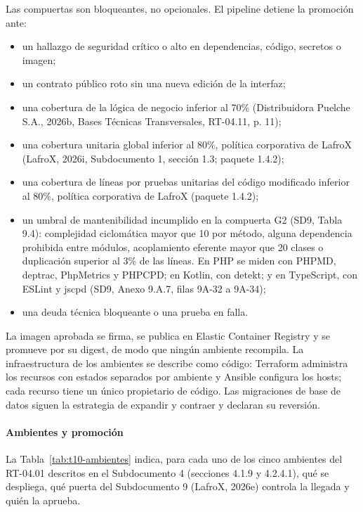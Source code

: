 \documentclass[carta,firma,final]{lafrox}
\begin{document}
Las compuertas son bloqueantes, no opcionales. El pipeline detiene la promoción ante:
\begin{itemize}
    \item un hallazgo de seguridad crítico o alto en dependencias, código, secretos o imagen;
    \item un contrato público roto sin una nueva edición de la interfaz;
    \item una cobertura de la lógica de negocio inferior al 70\% (Distribuidora Puelche S.A., 2026b, Bases Técnicas Transversales, RT-04.11, p. 11);
    \item una cobertura unitaria global inferior al 80\%, política corporativa de LafroX (LafroX, 2026i, Subdocumento 1, sección 1.3; paquete 1.4.2);
    \item una cobertura de líneas por pruebas unitarias del código modificado inferior al 80\%, política corporativa de LafroX (paquete 1.4.2);
    \item un umbral de mantenibilidad incumplido en la compuerta G2 (SD9, Tabla 9.4): complejidad ciclomática mayor que 10 por método, alguna dependencia prohibida entre módulos, acoplamiento eferente mayor que 20 clases o duplicación superior al 3\% de las líneas. En PHP se miden con PHPMD, deptrac, PhpMetrics y PHPCPD; en Kotlin, con detekt; y en TypeScript, con ESLint y jscpd (SD9, Anexo 9.A.7, filas 9A-32 a 9A-34);
    \item una deuda técnica bloqueante o una prueba en falla.
\end{itemize}

La imagen aprobada se firma, se publica en Elastic Container Registry y se promueve por su digest, de modo que ningún ambiente recompila. La infraestructura de los ambientes se describe como código: Terraform administra los recursos con estados separados por ambiente y Ansible configura los hosts; cada recurso tiene un único propietario de código. Las migraciones de base de datos siguen la estrategia de expandir y contraer y declaran su reversión.

\paragraph{Ambientes y promoción}
La Tabla~\ref{tab:t10-ambientes} indica, para cada uno de los cinco ambientes del RT-04.01 descritos en el Subdocumento 4 (secciones 4.1.9 y 4.2.4.1), qué se despliega, qué puerta del Subdocumento 9 (LafroX, 2026e) controla la llegada y quién la aprueba.
\end{document}
